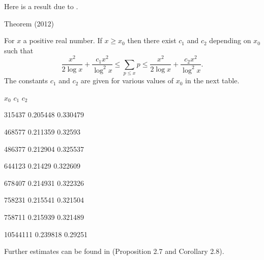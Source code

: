 \par 
  \par 
Here is a result due to 
\cite{Trevino*12}.
\par 
\begin{thm}{Theorem (2012)}

For $x$ a positive real number. If $x \geq x_0$ then there exist $c_1$
and $c_2$ depending on $x_0$ such that
$$
\frac{x^2}{2\log{x}} +
\frac{c_1 x^2}{\log^2{x}} \leq \sum_{p \leq x} p \leq
\frac{x^2}{2\log{x}} + \frac{c_2 x^2}{\log^2{x}}.
$$
The constants
$c_1$ and $c_2$ are given for various values of $x_0$ in the next
table.

  
  
    
      $x_0$
      $c_1$
      $c_2$
    
  
  
    315437
    0.205448
    0.330479
  
  
    468577
    0.211359
    0.32593
  
  
    486377
    0.212904
    0.325537
  
  
    644123
    0.21429
    0.322609
  
  
    678407
    0.214931
    0.322326
  
  
    758231
    0.215541
    0.321504
  
  
    758711
    0.215939
    0.321489
  
  
    10544111
    0.239818
    0.29251
  
  

\end{thm}

\par 

Further estimates can be found in
 \cite{Axler*19}
(Proposition 2.7 and Corollary 2.8).

